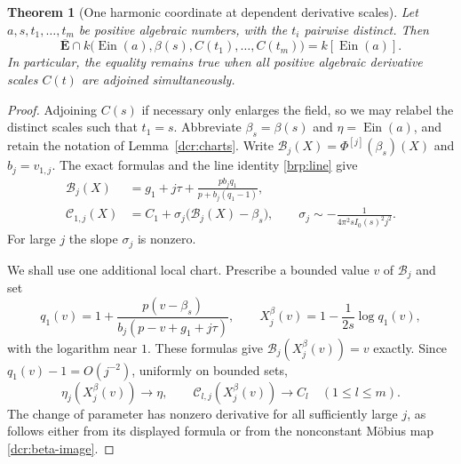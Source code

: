\documentclass[11pt]{article}
\newtheorem{theorem}{Theorem}[section]
\theoremstyle{definition}
\theoremstyle{remark}
\newcommand{\Ebar}{\overline{\mathbf E}}
\newcommand{\Ein}{\operatorname{Ein}}
\begin{document}
\begin{theorem}[One harmonic coordinate at dependent derivative scales]
\label{dcr:one-beta}
Let $a,s,t_1,\ldots,t_m$ be positive algebraic numbers, with the $t_i$
pairwise distinct. Then
\begin{equation}\label{dcr:one-beta-intersection}
 \boxed{\quad
 \Ebar\cap k\bigl(\Ein(a),\beta(s),C(t_1),\ldots,C(t_m)\bigr)
       =k[\Ein(a)].
 \quad}
\end{equation}
In particular, the equality remains true when all positive algebraic
derivative scales $C(t)$ are adjoined simultaneously.
\end{theorem}
\begin{proof}
Adjoining $C(s)$ if necessary only enlarges the field, so we may
relabel the distinct scales such that $t_1=s$. Abbreviate
$\beta_s=\beta(s)$ and $\eta=\Ein(a)$, and retain the notation of
Lemma~\ref{dcr:charts}. Write
$\mathscr B_j(X)=\Phi^{[j]}(\beta_s)(X)$ and $b_j=v_{1,j}$. The
exact formulas and the line identity \eqref{brp:line} give
\begin{align}
 \mathscr B_j(X)
 &=g_1+j\tau+
       \frac{p b_jq_1}{p+b_j(q_1-1)},\label{dcr:beta-image}\\
 \mathscr C_{1,j}(X)
 &=C_1+\sigma_j\bigl(\mathscr B_j(X)-\beta_s\bigr),
 \qquad
 \sigma_j\sim-\frac1{4\pi^2sI_0(s)^2j^2}.
 \label{dcr:beta-line}
\end{align}
For large $j$ the slope $\sigma_j$ is nonzero.

We shall use one additional local chart. Prescribe a bounded value $v$
of $\mathscr B_j$ and set
\[
 q_1(v)=1+\frac{p(v-\beta_s)}{b_j(p-v+g_1+j\tau)},
 \qquad
 X_j^{\beta}(v)=1-\frac1{2s}\log q_1(v),
\]
with the logarithm near $1$. These formulas give
$\mathscr B_j(X_j^{\beta}(v))=v$ exactly. Since $q_1(v)-1=O(j^{-2})$,
uniformly on bounded sets,
\begin{equation}\label{dcr:beta-chart}
 \eta_j(X_j^{\beta}(v))\longrightarrow\eta,
 \qquad
 \mathscr C_{l,j}(X_j^{\beta}(v))\longrightarrow C_l
 \quad(1\le l\le m).
\end{equation}
The change of parameter has nonzero derivative for all sufficiently
large $j$, as follows either from its displayed formula or from the
nonconstant M\"obius map \eqref{dcr:beta-image}.


\end{proof}
\end{document}
